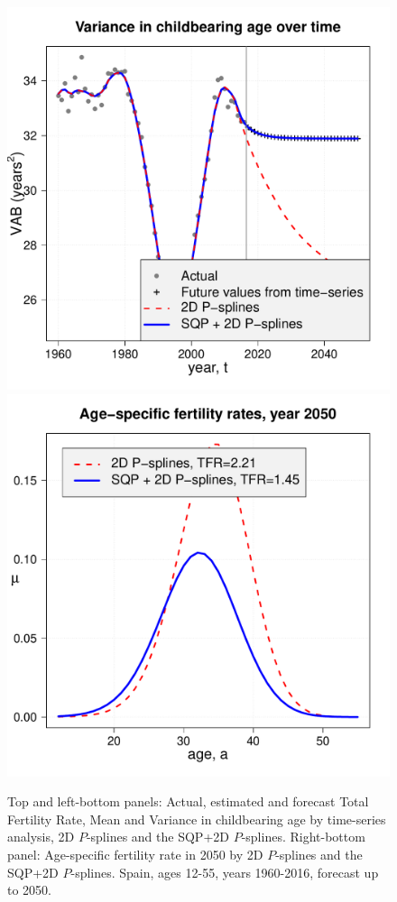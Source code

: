 \documentclass[twoside]{report}
\begin{document}
\begin{figure}[!ht]
	\includegraphics[scale=0.25]{CamardaVAB.pdf}
	\includegraphics[scale=0.25]{CamardaFert2050.pdf}
	\caption{\label{fig:CamardaFert} Top and left-bottom panels: Actual, estimated and forecast Total Fertility Rate, Mean and Variance in childbearing age by time-series analysis, 2D $P$-splines and the SQP+2D $P$-splines. Right-bottom panel: Age-specific fertility rate in 2050 by 2D $P$-splines and the SQP+2D $P$-splines. Spain, ages 12-55, years 1960-2016, forecast up to 2050.}
\end{figure}
\end{document}

